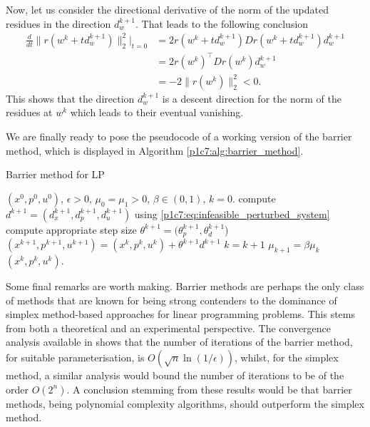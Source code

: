 Now, let us consider the directional derivative of the norm of the updated residues in the direction $d_w^{k+1}$. That leads to the following conclusion
	\begin{equation*}
		\begin{aligned}
		\frac{d}{dt} \big\| r(w^k + td_w^{k+1}) \big\|_2^2 \Big|_{t = 0} 
			&= 2r(w^k + t d_w^{k+1})Dr(w^k + td_w^{k+1})d_w^{k+1} \\
			&= 2r(w^k)^\top Dr(w^k)d_w^{k+1} \\
			&= -2 \| r(w^k) \|_2^2 < 0.
		\end{aligned}
	\end{equation*}
	This shows that the direction $d_w^{k+1}$ is a descent direction for the norm of the residues at $w^k$ which leads to their eventual vanishing.	
	
We are finally ready to pose the pseudocode of a working version of the barrier method, which is displayed in Algorithm \ref{p1c7:alg:barrier_method}.
	\captionsetup[algorithm]{font=footnotesize}
	\begin{algorithm}[H]
	\caption{Barrier method for LP} \label{p1c7:alg:barrier_method}
	\begin{algorithmic}[1] 
	 $(x^0, p^0, u^0)$, $\epsilon > 0$, $\mu_0 = \mu_1>0$, $\beta \in (0,1)$, $k = 0$. 
	    \State compute $d^{k+1} = (d_x^{k+1}, d_p^{k+1}, d_u^{k+1})$ using \eqref{p1c7:eq:infeasible_perturbed_system} 
	    \State compute appropriate step size $\theta^{k+1} = (\theta_p^{k+1}, \theta_d^{k+1}$)
	    \State $(x^{k+1}, p^{k+1}, u^{k+1}) = (x^k, p^k, u^k) + \theta^{k+1}d^{k+1}$
	    \State $k = k+1$
	    \State $\mu_{k+1} = \beta\mu_k$
	\EndWhile
	 $(x^k, p^k, u^k)$.
	\end{algorithmic} 
	\end{algorithm}
	
Some final remarks are worth making. Barrier methods are perhaps the only class of methods that are known for being strong contenders to the dominance of simplex method-based approaches for linear programming problems. This stems from both a theoretical and an experimental perspective. The convergence analysis available in \cite{gondzio2012interior} shows that the number of iterations of the barrier method, for suitable parameterisation, is $O(\sqrt{n}\ln(1/\epsilon))$, whilst, for the simplex method, a similar analysis would bound the number of iterations to be of the order $O(2^n)$. A conclusion stemming from these results would be that barrier methods, being polynomial complexity algorithms, should outperform the simplex method.

